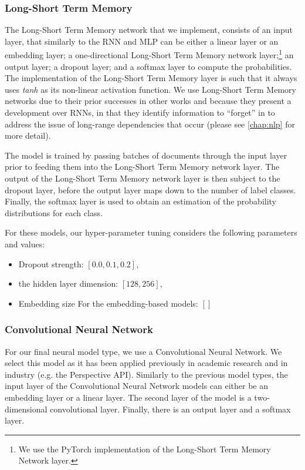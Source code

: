 \subsubsection{Long-Short Term Memory}

The Long-Short Term Memory network that we implement, consists of an input layer, that similarly to the RNN and MLP can be either a linear layer or an embedding layer; a one-directional Long-Short Term Memory network layer;\footnote{We use the PyTorch implementation of the Long-Short Term Memory Network layer.} an output layer; a dropout layer; and a softmax layer to compute the probabilities. The implementation of the Long-Short Term Memory layer is such that it always uses \textit{tanh} as its non-linear activation function. We use Long-Short Term Memory networks due to their prior successes in other works \cite{CITE: LSTM papers} and because they present a development over RNNs, in that they identify information to ``forget'' in to address the issue of long-range dependencies that occur (please see \autoref{chap:nlp} for more detail).

The model is trained by passing batches of documents through the input layer prior to feeding them into the Long-Short Term Memory network layer. The output of the Long-Short Term Memory network layer is then subject to the dropout layer, before the output layer maps down to the number of label classes. Finally, the softmax layer is used to obtain an estimation of the probability distributions for each class.

For these models, our hyper-parameter tuning considers the following parameters and values:

\begin{itemize}
  \item Dropout strength: $[0.0, 0.1, 0.2]$, 
  \item the hidden layer dimension: $[128, 256]$,
  \item Embedding size  For the embedding-based models: $[]$
\end{itemize}

\subsubsection{Convolutional Neural Network}

For our final neural model type, we use a Convolutional Neural Network. We select this model as it has been applied previously in academic research \cite{CITE: CNN papers} and in industry (e.g. the Perspective API). Similarly to the previous model types, the input layer of the Convolutional Neural Network models can either be an embedding layer or a linear layer. The second layer of the model is a two-dimensional convolutional layer. Finally, there is an output layer and a softmax layer.

